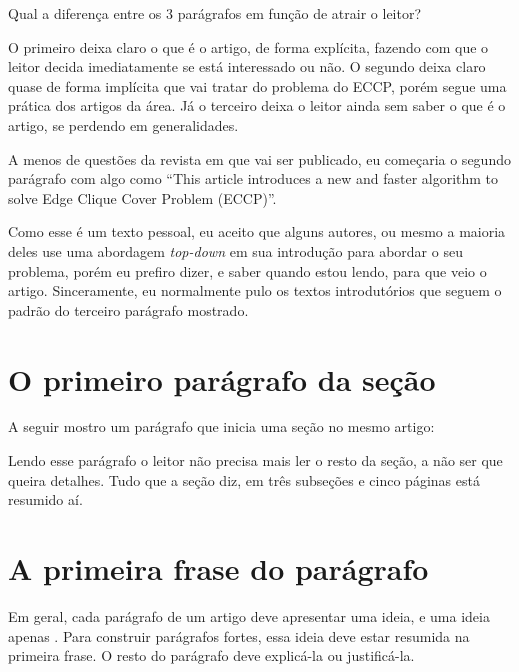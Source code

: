 \documentclass[openany]{book}
\begin{document}
Qual a diferença entre os 3 parágrafos em função de atrair o leitor?

O primeiro deixa claro o que é o artigo, de forma explícita, fazendo com que o leitor decida imediatamente se está interessado ou não. O segundo deixa claro quase de forma implícita que vai tratar do problema do ECCP, porém segue uma prática dos artigos da área. Já o terceiro deixa o leitor ainda sem saber o que é o artigo, se perdendo em generalidades.

A menos de questões da revista em que vai ser publicado, eu começaria o segundo parágrafo com algo como \enquote{This article introduces a new and faster algorithm to solve Edge Clique Cover Problem (ECCP)}.

Como esse é um texto pessoal, eu aceito que alguns autores, ou mesmo a maioria deles use uma abordagem \textit{top-down} em sua introdução para abordar o seu problema, porém eu prefiro dizer, e saber quando estou lendo, para que veio o artigo. Sinceramente, eu normalmente pulo os textos introdutórios que seguem o padrão do terceiro parágrafo mostrado.

\section{O primeiro parágrafo da seção}

  A seguir mostro um parágrafo que inicia uma seção no mesmo artigo:


Lendo esse parágrafo o leitor não precisa mais ler o resto da seção, a não ser que queira detalhes. Tudo que a seção diz, em três subseções e cinco páginas está resumido aí.

\section{A primeira frase do parágrafo}

 Em geral, cada parágrafo de um artigo deve apresentar uma ideia, e uma ideia apenas . Para construir parágrafos fortes, essa ideia deve estar resumida na primeira frase. O resto do parágrafo deve explicá-la ou justificá-la.
\end{document}
